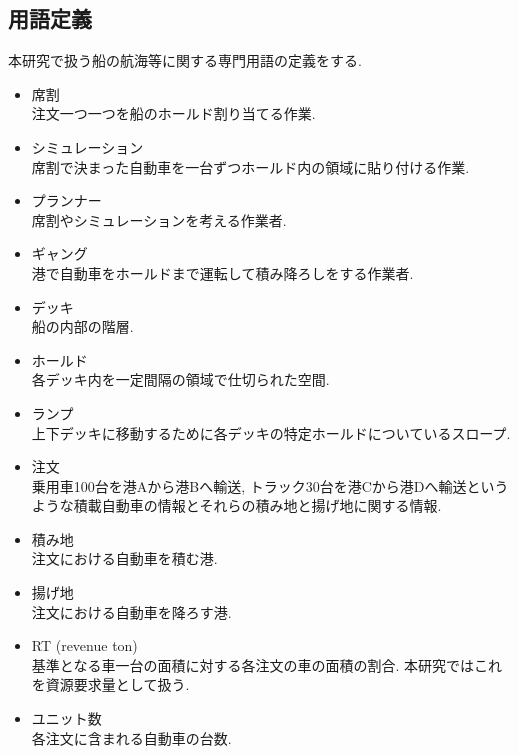 \documentclass[a4j,11pt,twocolumn]{jsarticle}
\begin{document}
\subsection{用語定義}
本研究で扱う船の航海等に関する専門用語の定義をする.

\begin{itemize}

\item 席割 \\
注文一つ一つを船のホールド割り当てる作業.

\item シミュレーション \\
席割で決まった自動車を一台ずつホールド内の領域に貼り付ける作業.

\item  プランナー \\
席割やシミュレーションを考える作業者.

\item  ギャング\\
港で自動車をホールドまで運転して積み降ろしをする作業者.

\item デッキ \\
船の内部の階層.

\item ホールド \\
各デッキ内を一定間隔の領域で仕切られた空間.

\item ランプ \\
上下デッキに移動するために各デッキの特定ホールドについているスロープ.

\item 注文 \\
乗用車100台を港Aから港Bへ輸送, トラック30台を港Cから港Dへ輸送というような積載自動車の情報とそれらの積み地と揚げ地に関する情報.

\item 積み地 \\
注文における自動車を積む港.

\item 揚げ地 \\
注文における自動車を降ろす港.

\item  RT (revenue ton) \\
基準となる車一台の面積に対する各注文の車の面積の割合. 本研究ではこれを資源要求量として扱う\cite{SA}.

\item ユニット数 \\
各注文に含まれる自動車の台数.

\end{itemize}
\end{document}
